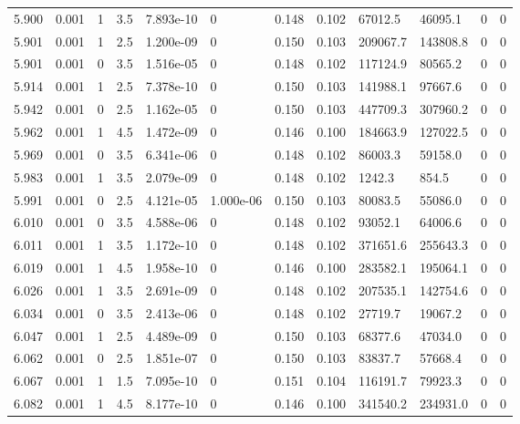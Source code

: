 \documentclass[preview]{standalone}
\begin{document}
{{{{{{{{{{{{{{\begin{tabular}{L{1.2cm}C{1.2cm} C{0.3cm}C{0.5cm} C{1.4cm}C{1.4cm} C{1.4cm}C{1.4cm} C{1.6cm}C{1.6cm} C{1.6cm}C{1.6cm}}
  5.900  &  0.001  & 1     & 3.5 &  7.893e-10  & 0  &  0.148&   0.102& 67012.5 & 46095.1   &  0 & 0  \\ 
  5.901  &  0.001  & 1     & 2.5 &  1.200e-09  & 0  &  0.150&   0.103& 209067.7 & 143808.8   &  0 & 0  \\ 
  5.901  &  0.001  & 0     & 3.5 &  1.516e-05  & 0  &  0.148&   0.102& 117124.9 & 80565.2   &  0 & 0  \\ 
  5.914  &  0.001  & 1     & 2.5 &  7.378e-10  & 0  &  0.150&   0.103& 141988.1 & 97667.6   &  0 & 0  \\ 
  5.942  &  0.001  & 0     & 2.5 &  1.162e-05  & 0  &  0.150&   0.103& 447709.3 & 307960.2   &  0 & 0  \\ 
  5.962  &  0.001  & 1     & 4.5 &  1.472e-09  & 0  &  0.146&   0.100& 184663.9 & 127022.5   &  0 & 0  \\ 
  5.969  &  0.001  & 0     & 3.5 &  6.341e-06  & 0  &  0.148&   0.102& 86003.3 & 59158.0   &  0 & 0  \\ 
  5.983  &  0.001  & 1     & 3.5 &  2.079e-09  & 0  &  0.148&   0.102& 1242.3 & 854.5   &  0 & 0  \\ 
  5.991  &  0.001  & 0     & 2.5 &  4.121e-05  & 1.000e-06  &  0.150&   0.103& 80083.5 & 55086.0   &  0 & 0  \\ 
  6.010  &  0.001  & 0     & 3.5 &  4.588e-06  & 0  &  0.148&   0.102& 93052.1 & 64006.6   &  0 & 0  \\ 
  6.011  &  0.001  & 1     & 3.5 &  1.172e-10  & 0  &  0.148&   0.102& 371651.6 & 255643.3   &  0 & 0  \\ 
  6.019  &  0.001  & 1     & 4.5 &  1.958e-10  & 0  &  0.146&   0.100& 283582.1 & 195064.1   &  0 & 0  \\ 
  6.026  &  0.001  & 1     & 3.5 &  2.691e-09  & 0  &  0.148&   0.102& 207535.1 & 142754.6   &  0 & 0  \\ 
  6.034  &  0.001  & 0     & 3.5 &  2.413e-06  & 0  &  0.148&   0.102& 27719.7 & 19067.2   &  0 & 0  \\ 
  6.047  &  0.001  & 1     & 2.5 &  4.489e-09  & 0  &  0.150&   0.103& 68377.6 & 47034.0   &  0 & 0  \\ 
  6.062  &  0.001  & 0     & 2.5 &  1.851e-07  & 0  &  0.150&   0.103& 83837.7 & 57668.4   &  0 & 0  \\ 
  6.067  &  0.001  & 1     & 1.5 &  7.095e-10  & 0  &  0.151&   0.104& 116191.7 & 79923.3   &  0 & 0  \\ 
  6.082  &  0.001  & 1     & 4.5 &  8.177e-10  & 0  &  0.146&   0.100& 341540.2 & 234931.0   &  0 & 0  \\ 

\end{tabular}}}}}}}}}}}}}}}
\end{document}
